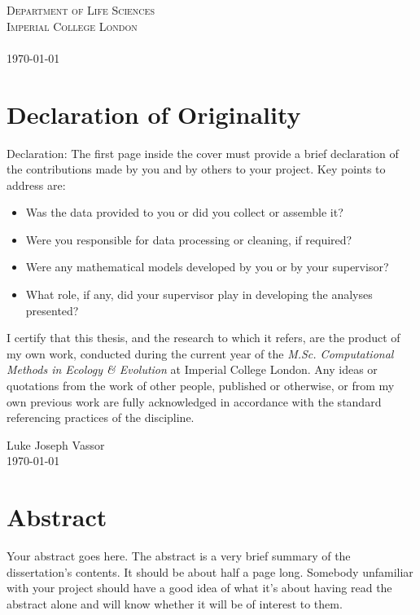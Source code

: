 \documentclass[a4paper]{article} %
\begin{document}
\begin{titlepage}
    \textsc{Department of Life Sciences \\ Imperial College London \\ \ }\\[1cm]
    \textsc{\today}\\[2cm] %
    
    \vfill %
    
\end{titlepage}

\section*{Declaration of Originality}\thispagestyle{empty}
    Declaration: The first page inside the cover must provide a brief declaration of the contributions
    made by you and by others to your project. Key points to address are:
    \begin{itemize}
        \item Was the data provided to you or did you collect or assemble it?
        \item Were you responsible for data processing or cleaning, if required?
        \item Were any mathematical models developed by you or by your supervisor?
        \item What role, if any, did your supervisor play in developing the analyses presented?
    \end{itemize}
    I certify that this thesis, and the research to which it refers, are the product of my own work, conducted during the current year of the \emph{M.Sc. Computational Methods in Ecology \& Evolution} at Imperial College London. Any ideas or quotations from the work of other people, published or otherwise, or from my own previous work are fully acknowledged in accordance with the standard referencing practices of the discipline.
    \vspace{3cm}
    \begin{flushright}
        Luke Joseph Vassor \\
        \today
    \end{flushright}

\section*{Abstract}\thispagestyle{empty}
    Your abstract goes here. The abstract is a very brief summary of the dissertation's contents. It should be about half a page long. Somebody unfamiliar with your project should have a good idea of what it's about having read the abstract alone and will know whether it will be of interest to them.
\end{document}
